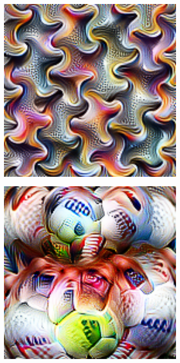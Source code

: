 \begin{figure}[!htb]
	\begin{center}
		\begin{subfigure}[h]{0.23\textwidth}
			\centering
			\includegraphics[width=1\textwidth]{"contents/images/02-feature-bird-2"}
		\end{subfigure}
		\hfill
		\begin{subfigure}[h]{0.23\textwidth}
			\centering
			\includegraphics[width=1\textwidth]{"contents/images/02-feature-ball-2"}

\end{subfigure}
\end{center}
\end{figure}
